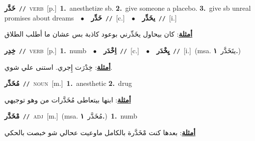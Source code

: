\documentclass[10pt,a4paper,twoside]{article} %
\begin{document}
\begin{multicols}{2}
{\setlength\topsep{0pt}\textbf{\foreignlanguage{arabic}{خَدَّر}}\ {\color{gray}\texttt{//}\color{black}}\ \textsc{verb}\ [p.]\ \textbf{1.}~anesthetize sb.  \textbf{2.}~give someone a placebo.  \textbf{3.}~give sb unreal promises about dreams\ \ $\bullet$\ \ \setlength\topsep{0pt}\textbf{\foreignlanguage{arabic}{خَدِّر}}\ {\color{gray}\texttt{//}\color{black}}\ [c.]\ \ $\bullet$\ \ \setlength\topsep{0pt}\textbf{\foreignlanguage{arabic}{يخَدِّر}}\ {\color{gray}\texttt{//}\color{black}}\ [i.]\  \begin{flushright}\color{gray}\foreignlanguage{arabic}{\textbf{\underline{\foreignlanguage{arabic}{أمثلة}}}: كان بيحاول يخَدِّرني بوعود كاذبة بس عشان ما أطلب الطلاق}\end{flushright}\color{black}} \vspace{2mm}

{\setlength\topsep{0pt}\textbf{\foreignlanguage{arabic}{خِدِر}}\ {\color{gray}\texttt{//}\color{black}}\ \textsc{verb}\ [p.]\ \textbf{1.}~numb\ \ $\bullet$\ \ \setlength\topsep{0pt}\textbf{\foreignlanguage{arabic}{اِخْدَر}}\ {\color{gray}\texttt{//}\color{black}}\ [c.]\ \ $\bullet$\ \ \setlength\topsep{0pt}\textbf{\foreignlanguage{arabic}{يِخْدَر}}\ {\color{gray}\texttt{//}\color{black}}\ [i.]\ \color{gray}(msa. \foreignlanguage{arabic}{يتَخَدَّر}~\foreignlanguage{arabic}{\textbf{١.}})\color{black}\  \begin{flushright}\color{gray}\foreignlanguage{arabic}{\textbf{\underline{\foreignlanguage{arabic}{أمثلة}}}: خِدْرَت إِجري. استنى علي شوي.}\end{flushright}\color{black}} \vspace{2mm}

{\setlength\topsep{0pt}\textbf{\foreignlanguage{arabic}{مُخَدِّر}}\ {\color{gray}\texttt{//}\color{black}}\ \textsc{noun}\ [m.]\ \textbf{1.}~anesthetic  \textbf{2.}~drug\  \begin{flushright}\color{gray}\foreignlanguage{arabic}{\textbf{\underline{\foreignlanguage{arabic}{أمثلة}}}: ابنها بيتعاطى مُخَدَّرات من وهو توجيهي}\end{flushright}\color{black}} \vspace{2mm}

{\setlength\topsep{0pt}\textbf{\foreignlanguage{arabic}{مْخَدَّر}}\ {\color{gray}\texttt{//}\color{black}}\ \textsc{adj}\ [m.]\ \color{gray}(msa. \foreignlanguage{arabic}{مُخَدَّر}~\foreignlanguage{arabic}{\textbf{١.}})\color{black}\ \textbf{1.}~numb\  \begin{flushright}\color{gray}\foreignlanguage{arabic}{\textbf{\underline{\foreignlanguage{arabic}{أمثلة}}}: بعدها كنت مْخَدَّرة بالكامل ماوعيت عحالي شو خبصت بالحكي}\end{flushright}\color{black}} \vspace{2mm}


\end{multicols}
\end{document}
